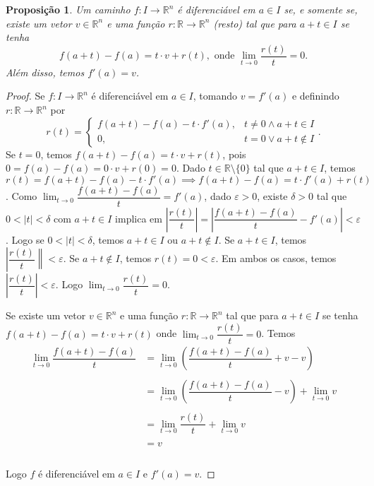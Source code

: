 \documentclass{article}
\newtheorem{prop}{Proposição}[section]
\theoremstyle{theorem}
\theoremstyle{lemma}
\theoremstyle{definition}
\theoremstyle{remark}
\begin{document}
   \begin{prop}
	   Um caminho \( f:I\to \mathbb{R}^n \) é diferenciável em \(a\in I\) se, e somente se, existe um vetor \(v\in \mathbb{R}^n\) e uma função $r: \mathbb{R} \to \mathbb{R}^n$ (resto) tal que para \(a+t\in I\) se tenha \[ f(a+t) - f(a) = t\cdot v + r(t), \text{ onde } \lim_{t \to 0} \dfrac{r(t)}{t} = 0.\]
	   Além disso, temos \(f'(a) = v\).
   \end{prop}
   \begin{proof}
	   Se \( f: I\to \mathbb{R}^n \) é diferenciável em \(a\in I\), tomando $v = f'(a)$ e definindo \(r:\mathbb{R}\to \mathbb{R}^n\) por \[ r(t) = \begin{cases} f(a+t) - f(a)  - t\cdot f'(a), &   t\neq 0\land a+t \in I\\
		   0, &   t = 0 \lor a+t \not \in I
	   \end{cases}.\]
	   Se \(t = 0\), temos \(f(a+t) - f(a) = t\cdot v + r(t)\), pois \( 0 = f(a) - f(a) = 0\cdot v + r(0) = 0\). Dado \(t\in \mathbb{R}\setminus \{0\} \) tal que \(a+t\in I\), temos \(r(t) = f(a+t) - f(a) - t\cdot f'(a) \implies f(a+t) - f(a) = t\cdot f'(a) +r(t)\). Como \(\displaystyle \lim_{t\to 0} \dfrac{f(a+t) -f(a)}{t} = f'(a)\), dado \(\varepsilon>0\), existe \(\delta>0\) tal que \(0 < |t| < \delta\) com \( a+t\in I\) implica em \( \left| \dfrac{r(t)}{t} \right| = \left| \dfrac{f(a+t) - f(a)}{t} - f'(a) \right| < \varepsilon\). Logo se \(0 < |t| < \delta\), temos \(a+t\in I\) ou \(a+t\not \in I\). Se \(a+t\in I \), temos \( \left|\dfrac{r(t)}{t} \right\| < \varepsilon\). Se \( a+t\not \in I\), temos \( r(t) = 0 < \varepsilon\). Em ambos os casos, temos \( \left|\dfrac{r(t)}{t} \right| < \varepsilon \). Logo \( \displaystyle\lim_{t \to 0} \dfrac{r(t)}{t} =0 \).

	   Se existe um vetor \(v\in \mathbb{R}^n\) e uma função $r: \mathbb{R} \to \mathbb{R}^n$  tal que para \(a+t\in I\) se tenha \( f(a+t) - f(a) = t\cdot v + r(t)\) onde \(\displaystyle \lim_{t \to 0} \dfrac{r(t)}{t} = 0\). Temos 
	   \begin{align*}
		   \lim_{t\to 0}\dfrac{f(a+t) - f(a)}{t} &=  \lim_{t\to 0}\left( \dfrac{f(a+t) - f(a)}{t} +v - v\right) \\~\\
		   &=  \lim_{t\to 0}\left( \dfrac{f(a+t) - f(a)}{t} - v\right) + \lim_{t\to 0} v \\~\\
		   &=  \lim_{t\to 0} \dfrac{r(t)}{t}  + \lim_{t\to 0} v \\~\\
		   &=  v \\~\\
	   \end{align*}

	   Logo \(f\) é  diferenciável em \(a\in I\) e \(f'(a) = v\).

   \end{proof}
\end{document}
